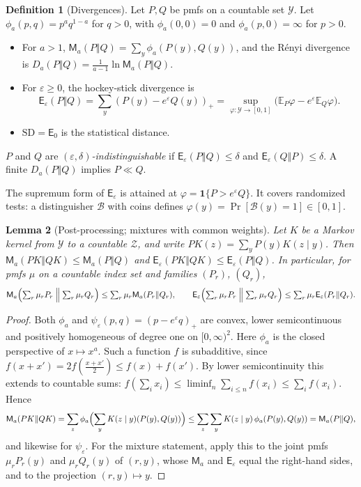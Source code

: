 \documentclass[11pt]{article}
\theoremstyle{definition}
\newtheorem{definition}{Definition}[section]
\theoremstyle{plain}
\newtheorem{lemma}[definition]{Lemma}
\newcommand{\Ex}{\mathbb{E}}
\newcommand{\SD}{\mathrm{SD}}
\newcommand{\HSd}{\mathsf{E}}
\newcommand{\Ma}{\mathsf{M}}
\begin{document}
\begin{definition}[Divergences]\label{def:div}
Let $P,Q$ be pmfs on a countable set $\mathcal Y$. Let $\phi_a(p,q)=p^aq^{1-a}$ for $q>0$, with $\phi_a(0,0)=0$ and $\phi_a(p,0)=\infty$ for $p>0$.
\begin{itemize}[nosep]
  \item For $a>1$, $\Ma_a(P\Vert Q)=\sum_y\phi_a(P(y),Q(y))$, and the R\'enyi divergence is $D_a(P\Vert Q)=\frac1{a-1}\ln\Ma_a(P\Vert Q)$.
  \item For $\varepsilon\ge0$, the hockey-stick divergence is
  \[
    \HSd_\varepsilon(P\Vert Q)=\sum_y(P(y)-e^\varepsilon Q(y))_+=\sup_{\varphi:\mathcal Y\to[0,1]}\bigl(\Ex_P\varphi-e^\varepsilon\Ex_Q\varphi\bigr).
  \]
  \item $\SD=\HSd_0$ is the statistical distance.
\end{itemize}
$P$ and $Q$ are \emph{$(\varepsilon,\delta)$-indistinguishable} if $\HSd_\varepsilon(P\Vert Q)\le\delta$ and $\HSd_\varepsilon(Q\Vert P)\le\delta$. A finite $D_a(P\Vert Q)$ implies $P\ll Q$.
\end{definition}

The supremum form of $\HSd_\varepsilon$ is attained at $\varphi=\mathbf 1\{P>e^\varepsilon Q\}$. It covers randomized tests: a distinguisher $\mathcal B$ with coins defines $\varphi(y)=\Pr[\mathcal B(y)=1]\in[0,1]$.

\begin{lemma}[Post-processing; mixtures with common weights]\label{lem:post}
Let $K$ be a Markov kernel from $\mathcal Y$ to a countable $\mathcal Z$, and write $PK(z)=\sum_yP(y)K(z\mid y)$. Then $\Ma_a(PK\Vert QK)\le\Ma_a(P\Vert Q)$ and $\HSd_\varepsilon(PK\Vert QK)\le\HSd_\varepsilon(P\Vert Q)$. In particular, for pmfs $\mu$ on a countable index set and families $(P_r)$, $(Q_r)$,
\[
  \Ma_a\Bigl(\textstyle\sum_r\mu_rP_r\Bigm\Vert\sum_r\mu_rQ_r\Bigr)\le\sum_r\mu_r\Ma_a(P_r\Vert Q_r),\qquad
  \HSd_\varepsilon\Bigl(\textstyle\sum_r\mu_rP_r\Bigm\Vert\sum_r\mu_rQ_r\Bigr)\le\sum_r\mu_r\HSd_\varepsilon(P_r\Vert Q_r).
\]
\end{lemma}
\begin{proof}
Both $\phi_a$ and $\psi_\varepsilon(p,q)=(p-e^\varepsilon q)_+$ are convex, lower semicontinuous and positively homogeneous of degree one on $[0,\infty)^2$. Here $\phi_a$ is the closed perspective of $x\mapsto x^a$. Such a function $f$ is subadditive, since $f(x+x')=2f(\frac{x+x'}2)\le f(x)+f(x')$. By lower semicontinuity this extends to countable sums: $f(\sum_ix_i)\le\liminf_n\sum_{i\le n}f(x_i)\le\sum_if(x_i)$. Hence
\[
  \Ma_a(PK\Vert QK)=\sum_z\phi_a\Bigl(\sum_yK(z\mid y)(P(y),Q(y))\Bigr)\le\sum_z\sum_yK(z\mid y)\,\phi_a(P(y),Q(y))=\Ma_a(P\Vert Q),
\]
and likewise for $\psi_\varepsilon$. For the mixture statement, apply this to the joint pmfs $\mu_rP_r(y)$ and $\mu_rQ_r(y)$ of $(r,y)$, whose $\Ma_a$ and $\HSd_\varepsilon$ equal the right-hand sides, and to the projection $(r,y)\mapsto y$.
\end{proof}
\end{document}
